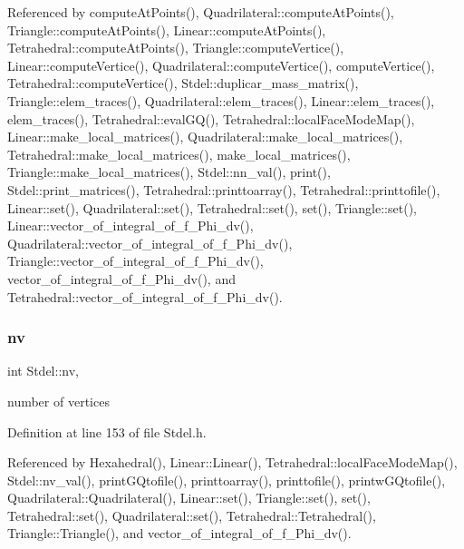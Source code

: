 Referenced by compute\+At\+Points(), Quadrilateral\+::compute\+At\+Points(), Triangle\+::compute\+At\+Points(), Linear\+::compute\+At\+Points(), Tetrahedral\+::compute\+At\+Points(), Triangle\+::compute\+Vertice(), Linear\+::compute\+Vertice(), Quadrilateral\+::compute\+Vertice(), compute\+Vertice(), Tetrahedral\+::compute\+Vertice(), Stdel\+::duplicar\+\_\+mass\+\_\+matrix(), Triangle\+::elem\+\_\+traces(), Quadrilateral\+::elem\+\_\+traces(), Linear\+::elem\+\_\+traces(), elem\+\_\+traces(), Tetrahedral\+::eval\+G\+Q(), Tetrahedral\+::local\+Face\+Mode\+Map(), Linear\+::make\+\_\+local\+\_\+matrices(), Quadrilateral\+::make\+\_\+local\+\_\+matrices(), Tetrahedral\+::make\+\_\+local\+\_\+matrices(), make\+\_\+local\+\_\+matrices(), Triangle\+::make\+\_\+local\+\_\+matrices(), Stdel\+::nn\+\_\+val(), print(), Stdel\+::print\+\_\+matrices(), Tetrahedral\+::printtoarray(), Tetrahedral\+::printtofile(), Linear\+::set(), Quadrilateral\+::set(), Tetrahedral\+::set(), set(), Triangle\+::set(), Linear\+::vector\+\_\+of\+\_\+integral\+\_\+of\+\_\+f\+\_\+\+Phi\+\_\+dv(), Quadrilateral\+::vector\+\_\+of\+\_\+integral\+\_\+of\+\_\+f\+\_\+\+Phi\+\_\+dv(), Triangle\+::vector\+\_\+of\+\_\+integral\+\_\+of\+\_\+f\+\_\+\+Phi\+\_\+dv(), vector\+\_\+of\+\_\+integral\+\_\+of\+\_\+f\+\_\+\+Phi\+\_\+dv(), and Tetrahedral\+::vector\+\_\+of\+\_\+integral\+\_\+of\+\_\+f\+\_\+\+Phi\+\_\+dv().

\mbox{\label{classStdel_a20c0e35541cab4a1f07974659ae7a9ad}} 
\subsubsection{\texorpdfstring{nv}{nv}}
{\footnotesize\ttfamily int Stdel\+::nv\hspace{0.3cm}{\ttfamily [protected]}, {\ttfamily [inherited]}}



number of vertices 



Definition at line 153 of file Stdel.\+h.



Referenced by Hexahedral(), Linear\+::\+Linear(), Tetrahedral\+::local\+Face\+Mode\+Map(), Stdel\+::nv\+\_\+val(), print\+G\+Qtofile(), printtoarray(), printtofile(), printw\+G\+Qtofile(), Quadrilateral\+::\+Quadrilateral(), Linear\+::set(), Triangle\+::set(), set(), Tetrahedral\+::set(), Quadrilateral\+::set(), Tetrahedral\+::\+Tetrahedral(), Triangle\+::\+Triangle(), and vector\+\_\+of\+\_\+integral\+\_\+of\+\_\+f\+\_\+\+Phi\+\_\+dv().

